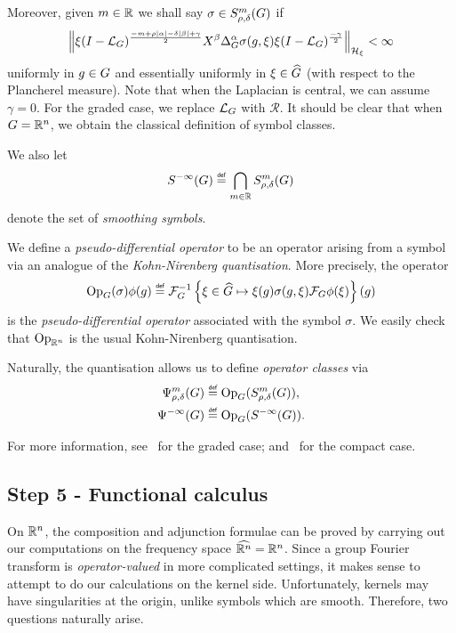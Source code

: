 Moreover,
given $m \in \R$
we shall say $\sigma \in \SymbolClass m {\rho, \delta}$ if
\begin{align*}
    \norm [\mathcal H_\xi] {%
        \xi \BesselPotential {-m + \rho \abs \alpha - \delta \abs \beta + \gamma}
        \LeftDifferentialOperator \beta \DifferenceOperatorOrder \alpha \sigma(g, \xi)
        \xi \BesselPotential {-\gamma}
    }
    < \infty
\end{align*}
uniformly in $g \in \Group$
and essentially uniformly in $\xi \in \dualGroup \Group$ (with respect to the Plancherel measure).
Note that when the Laplacian is central,
we can assume $\gamma = 0$.
For the graded case,
we replace $\Laplacian$ with $\mathcal R$.
It should be clear that when $\Group = \R^n$,
we obtain the classical definition of symbol classes.

We also let
\begin{align*}
    \SmoothingSymbols \defeq \bigcap_{m \in \R} \SymbolClass m {\rho, \delta}
\end{align*}
denote the set of \emph{smoothing symbols}.

We define a \emph{pseudo-differential operator} to be an operator arising from a symbol via an analogue of the \emph{Kohn-Nirenberg quantisation}.
More precisely,
the operator
\begin{align*}
    \Op(\sigma) \phi(g)
    \defeq \InverseFourier \left\{ \xi \in \dualGroup \Group \mapsto \xi(g) \sigma(g, \xi) \Fourier \phi(\xi)\right\}(g)
\end{align*}
is the \emph{pseudo-differential operator} associated with the symbol $\sigma$.
We easily check that $\Op [\R^n]$ is the usual Kohn-Nirenberg quantisation.

Naturally,
the quantisation allows us to define \emph{operator classes} via
\begin{align*}
    \OperatorClass m {\rho, \delta} &\defeq \Op(\SymbolClass m {\rho, \delta}),\\
    \SmoothingOperators &\defeq \Op(\SmoothingSymbols).
\end{align*}

For more information,
see~\cite[Section 5.1]{FischerRuzhansky16} for the graded case;
and~\cite[Section 3.1]{Fischer2015} for the compact case.

\subsection*{Step 5 - Functional calculus}

On $\R^n$,
the composition and adjunction formulae can be proved by carrying out our computations on the frequency space $\dualGroup {\R^n} = \R^n$.
Since a group Fourier transform is \emph{operator-valued} in more complicated settings,
it makes sense to attempt to do our calculations on the kernel side.
Unfortunately,
kernels may have singularities at the origin,
unlike symbols which are smooth.
Therefore, two questions naturally arise.

